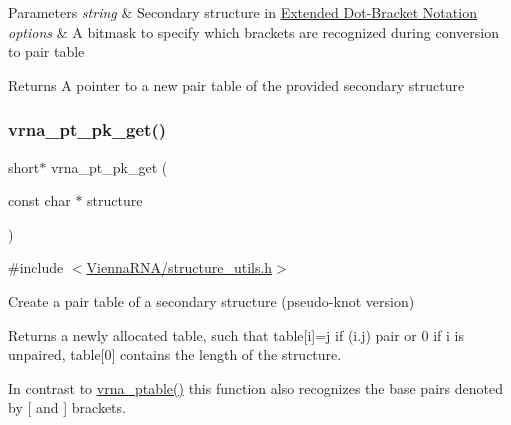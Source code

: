 \begin{DoxyParams}{Parameters}
{\em string} & Secondary structure in \hyperlink{rna_structure_notations_dot-bracket-ext-notation}{Extended Dot-\/\+Bracket Notation} \\
\hline
{\em options} & A bitmask to specify which brackets are recognized during conversion to pair table \\
\hline
\end{DoxyParams}
\begin{DoxyReturn}{Returns}
A pointer to a new pair table of the provided secondary structure 
\end{DoxyReturn}
\mbox{\label{group__struct__utils_gacca520048b24ec5a8978f4dafb4e4bf8}} 
\subsubsection{\texorpdfstring{vrna\+\_\+pt\+\_\+pk\+\_\+get()}{vrna\_pt\_pk\_get()}}
{\footnotesize\ttfamily short$\ast$ vrna\+\_\+pt\+\_\+pk\+\_\+get (\begin{DoxyParamCaption}\item[{const char $\ast$}]{structure }\end{DoxyParamCaption})}



{\ttfamily \#include $<$\hyperlink{structure__utils_8h}{Vienna\+R\+N\+A/structure\+\_\+utils.\+h}$>$}



Create a pair table of a secondary structure (pseudo-\/knot version) 

Returns a newly allocated table, such that table\mbox{[}i\mbox{]}=j if (i.\+j) pair or 0 if i is unpaired, table\mbox{[}0\mbox{]} contains the length of the structure.

In contrast to \hyperlink{group__struct__utils_gae829fb8bb7f694c12a9c0bbc34c77c60}{vrna\+\_\+ptable()} this function also recognizes the base pairs denoted by \textquotesingle{}\mbox{[}\textquotesingle{} and \textquotesingle{}\mbox{]}\textquotesingle{} brackets.


